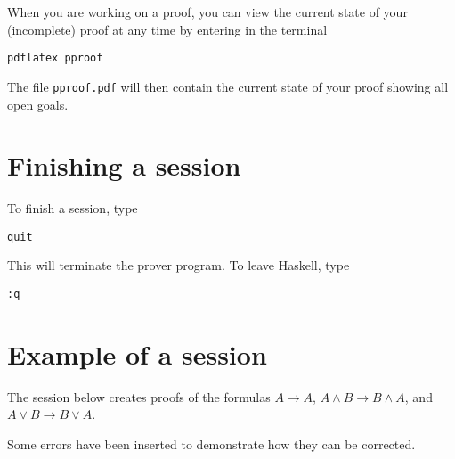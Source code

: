 \documentclass[12pt]{article}
\begin{document}
When you are working on a proof, you can view the current state
of your (incomplete) proof at any time by entering in the terminal
\begin{verbatim}
pdflatex pproof
\end{verbatim}
The file \verb|pproof.pdf| will then contain the current state of your proof
showing all open goals.


\section{Finishing a session}
\label{sec-finish}

To finish a session, type
\begin{verbatim}
quit
\end{verbatim}
This will terminate the prover program. To leave Haskell, type
\begin{verbatim}
:q
\end{verbatim}

\section{Example of a session}
\label{seq-session}


The session below creates proofs of the formulas 
$A\to A$, $A\land B \to B \land A$, and $A\lor B \to B \lor A$.

Some errors have been inserted to demonstrate how they can be corrected.
\end{document}
